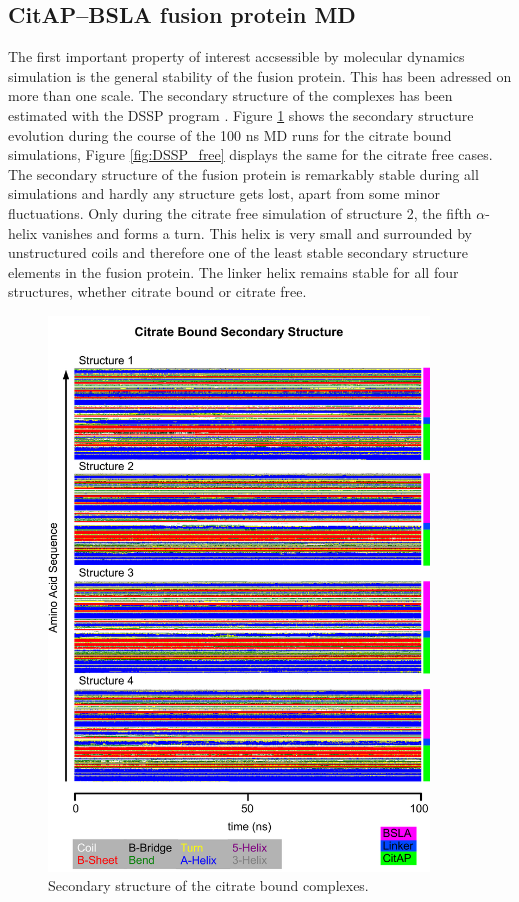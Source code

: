 \documentclass[english, a4paper, 12pt, titlepage, draft]{article}
\begin{document}
\subsection{CitAP--BSLA fusion protein MD}

The first important property of interest accsessible by molecular dynamics simulation is the general stability of the fusion protein.
This has been adressed on more than one scale.
The secondary structure of the complexes has been estimated with the DSSP program \cite{DSSPalgorithm, DSSPwebsite}.
Figure \ref{fig:DSSP_bound} shows the secondary structure evolution during the course of the 100 ns MD runs for the citrate bound simulations, Figure \ref{fig:DSSP_free} displays the same for the citrate free cases.
The secondary structure of the fusion protein is remarkably stable during all simulations and hardly any structure gets lost, apart from some minor fluctuations.
Only during the citrate free simulation of structure 2, the fifth $\alpha$-helix vanishes and forms a turn.
This helix is very small and surrounded by unstructured coils and therefore one of the least stable secondary structure elements in the fusion protein.
The linker helix remains stable for all four structures, whether citrate bound or citrate free.


\begin{figure}
    \centering
    \includegraphics[width=0.9\textwidth]{figures/DSSP/dssp_bound.pdf}
    \caption{Secondary structure of the citrate bound complexes.}
    \label{fig:DSSP_bound}
\end{figure}          
\end{document}
